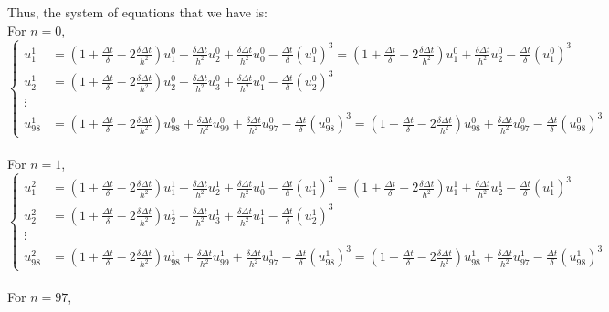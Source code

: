 \documentclass{article}
\begin{document}
\vspace{1em}
\noindent
Thus, the system of equations that we have is:\\
For $n = 0$,
\[
\renewcommand{\arraystretch}{1.5}
\left\{
\begin{array}{ll}
    u_1^1 &= (1 + \frac{\Delta t}{\delta} - 2\frac{\delta \Delta t}{h^2})u_1^0 + \frac{\delta \Delta t}{h^2}u_2^0 + \frac{\delta \Delta t }{h^2}u_0^0 - \frac{\Delta t }{\delta}(u_1^0)^3 = (1 + \frac{\Delta t}{\delta} - 2\frac{\delta \Delta t}{h^2})u_1^0 + \frac{\delta \Delta t}{h^2}u_2^0 - \frac{\Delta t }{\delta}(u_1^0)^3\\
    u_2^1 &= (1 + \frac{\Delta t}{\delta} - 2\frac{\delta \Delta t}{h^2})u_2^0 + \frac{\delta \Delta t}{h^2}u_3^0 + \frac{\delta \Delta t }{h^2}u_1^0 - \frac{\Delta t }{\delta}(u_2^0)^3\\
    \vdots\\
    u_{98}^1 &= (1 + \frac{\Delta t}{\delta} - 2\frac{\delta \Delta t}{h^2})u_{98}^0 + \frac{\delta \Delta t}{h^2}u_{99}^0 + \frac{\delta \Delta t }{h^2}u_{97}^0 - \frac{\Delta t }{\delta}(u_{98}^0)^3 = (1 + \frac{\Delta t}{\delta} - 2\frac{\delta \Delta t}{h^2})u_{98}^0 + \frac{\delta \Delta t }{h^2}u_{97}^0 - \frac{\Delta t }{\delta}(u_{98}^0)^3
\end{array}
\right.
\]\\
For $n = 1$,
\[
\renewcommand{\arraystretch}{1.5}
\left\{
\begin{array}{ll}
    u_1^2 &= (1 + \frac{\Delta t}{\delta} - 2\frac{\delta \Delta t}{h^2})u_1^1 + \frac{\delta \Delta t}{h^2}u_2^1 + \frac{\delta \Delta t}{h^2}u_0^1 - \frac{\Delta t}{\delta}(u_1^1)^3 = (1 + \frac{\Delta t}{\delta} - 2\frac{\delta \Delta t}{h^2})u_1^1 + \frac{\delta \Delta t}{h^2}u_2^1 - \frac{\Delta t}{\delta}(u_1^1)^3\\
    u_2^2 &= (1 + \frac{\Delta t}{\delta} - 2\frac{\delta \Delta t}{h^2})u_2^1 + \frac{\delta \Delta t}{h^2}u_3^1 + \frac{\delta \Delta t }{h^2}u_1^1 - \frac{\Delta t }{\delta}(u_2^1)^3\\
    \vdots\\
    u_{98}^2 &= (1 + \frac{\Delta t}{\delta} - 2\frac{\delta \Delta t}{h^2})u_{98}^1 + \frac{\delta \Delta t}{h^2}u_{99}^1 + \frac{\delta \Delta t }{h^2}u_{97}^1 - \frac{\Delta t }{\delta}(u_{98}^1)^3 = (1 + \frac{\Delta t}{\delta} - 2\frac{\delta \Delta t}{h^2})u_{98}^1 + \frac{\delta \Delta t }{h^2}u_{97}^1 - \frac{\Delta t }{\delta}(u_{98}^1)^3
\end{array}
\right.
\]\\
For $n = 97$,
\end{document}
